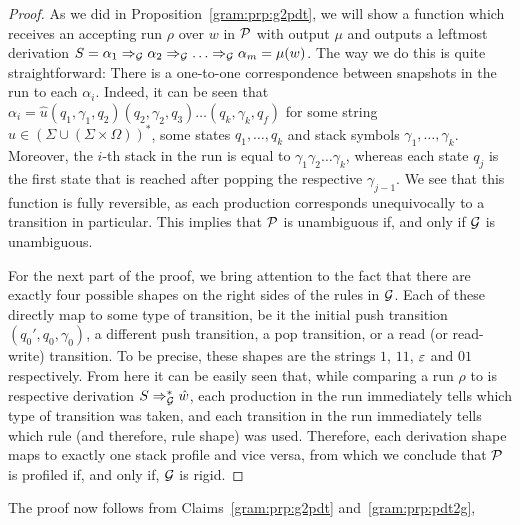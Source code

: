\begin{proof}
As we did in Proposition~\ref{gram:prp:g2pdt}, we will show a function which receives an accepting run $\rho$ over $w$ in $\mathcal{P}$ with output $\mu$ and outputs a leftmost derivation $S =\alpha_1\Rightarrow_{\mathcal{G}}\alpha_2\Rightarrow_{\mathcal{G}}\ldots\Rightarrow_{\mathcal{G}}\alpha_m = \mu(w)$. The way we do this is quite straightforward: There is a one-to-one correspondence between snapshots in the run to each $\alpha_i$. Indeed, it can be seen that $\alpha_i = \hat{u}(q_1, \gamma_1, q_2)(q_2, \gamma_2, q_3)\ldots(q_k, \gamma_k, q_f)$ for some string $\hat{u}\in (\Sigma\cup(\Sigma\times\Omega))^*$, some states $q_1,\ldots,q_k$ and stack symbols $\gamma_1, \ldots, \gamma_k$. Moreover, the $i$-th stack in the run is equal to $\gamma_1\gamma_2\ldots\gamma_k$, whereas each state $q_j$ is the first state that is reached after popping the respective $\gamma_{j-1}$. We see that this function is fully reversible, as each production corresponds unequivocally to a transition in particular. This implies that $\mathcal{P}$ is unambiguous if, and only if $\mathcal{G}$ is unambiguous.

For the next part of the proof, we bring attention to the fact that there are exactly four possible shapes on the right sides of the rules in $\mathcal{G}$. Each of these directly map to some type of transition, be it the initial push transition $(q_0', q_0, \gamma_0)$, a different push transition, a pop transition, or a read (or read-write) transition. To be precise, these shapes are the strings $1$, $11$, $\varepsilon$ and $01$ respectively. From here it can be easily seen that, while comparing a run $\rho$ to is respective derivation $S\Rightarrow_{\mathcal{G}}^*\hat{w}$, each production in the run immediately tells which type of transition was taken, and each transition in the run immediately tells which rule (and therefore, rule shape) was used. Therefore, each derivation shape maps to exactly one stack profile and vice versa, from which we conclude that $\mathcal{P}$ is profiled if, and only if, $\mathcal{G}$ is rigid.
\end{proof}
	
The proof now follows from Claims~\ref{gram:prp:g2pdt} and~\ref{gram:prp:pdt2g},